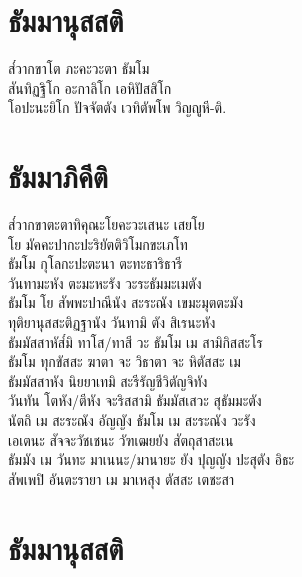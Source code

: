 \chapter{ธัมมานุสสติ}

\begin{leader}
\end{leader}

ส๎วากขาโต ภะคะวะตา ธัมโม\\
สันทิฏฐิโก อะกาลิโก เอหิปัสสิโก\\
โอปะนะยิโก ปัจจัตตัง เวทิตัพโพ วิญญูหี-ติ.\\

\chapter{ธัมมาภิคีติ}

\begin{leader}
\end{leader}

ส๎วากขาตะตาทิคุณะโยคะวะเสนะ เสยโย\\
โย มัคคะปากะปะริยัตติวิโมกขะเภโท\\
ธัมโม กุโลกะปะตะนา ตะทะธาริธารี\\
วันทามะหัง ตะมะหะรัง วะระธัมมะเมตัง\\
ธัมโม โย สัพพะปาณีนัง สะระณัง เขมะมุตตะมัง\\
ทุติยานุสสะติฏฐานัง วันทามิ ตัง สิเรนะหัง\\
ธัมมัสสาหัส๎มิ ทาโส/ทาสี วะ ธัมโม เม สามิกิสสะโร\\
ธัมโม ทุกขัสสะ ฆาตา จะ วิธาตา จะ หิตัสสะ เม\\
ธัมมัสสาหัง นิยยาเทมิ สะรีรัญชีวิตัญจิทัง\\
วันทัน โตหัง/ตีหัง จะริสสามิ ธัมมัสเสวะ สุธัมมะตัง\\
นัตถิ เม สะระณัง อัญญัง ธัมโม เม สะระณัง วะรัง\\
เอเตนะ สัจจะวัชเชนะ วัฑเฒยยัง สัตถุสาสะเน\\
ธัมมัง เม วันทะ มาเนนะ/มานายะ ยัง ปุญญัง ปะสุตัง อิธะ\\
สัพเพปิ อันตะรายา เม มาเหสุง ตัสสะ เตชะสา\\
\clearpage

\chapter{ธัมมานุสสติ}

\begin{leader}
\end{leader}

